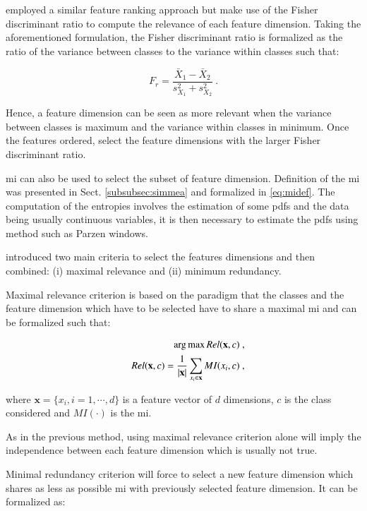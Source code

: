 \cite{Vos2012} employed a similar feature ranking approach but make use of the Fisher discriminant ratio to compute the relevance of each feature dimension. Taking the aforementioned formulation, the Fisher discriminant ratio is formalized as the ratio of the variance between classes to the variance within classes such that:

\begin{equation}
F_r = \frac{\bar{X}_1 - \bar{X}_2}{s^{2}_{X_1}+s^{2}_{X_2}} \ .
\label{eq:fisherratio}
\end{equation}

Hence, a feature dimension can be seen as more relevant when the variance between classes is maximum and the variance within classes in minimum. Once the features ordered, \cite{Vos2012} select the feature dimensions with the larger Fisher discriminant ratio.

\ac{mi} can also be used to select the subset of feature dimension. Definition of the \ac{mi} was presented in Sect. \ref{subsubsec:simmea} and formalized in \eqref{eq:midef}. The computation of the entropies involves the estimation of some \acp{pdf} and the data being usually continuous variables, it is then necessary to estimate the \acp{pdf} using method such as Parzen windows.

\cite{Peng2005} introduced two main criteria to select the features dimensions and then combined: (i) maximal relevance and (ii) minimum redundancy.

Maximal relevance criterion is based on the paradigm that the classes and the feature dimension which have to be selected have to share a maximal \ac{mi} and can be formalized such that:

\begin{eqnarray}
	&&\operatorname*{arg\,max} Rel(\mathbf{x},c) \ , \nonumber \\
	&& Rel(\mathbf{x},c) = \frac{1}{|\mathbf{x}|} \sum_{x_i \in \mathbf{x}} MI(x_i,c)  \ , \label{eq:mRel}
\end{eqnarray}

\noindent where $\mathbf{x} = \{x_i,i=1,\cdots,d\}$ is a feature vector of $d$ dimensions, $c$ is the class considered and $MI(\cdot)$ is the \ac{mi}.

As in the previous method, using maximal relevance criterion alone will imply the independence between each feature dimension which is usually not true.

Minimal redundancy criterion will force to select a new feature dimension which shares as less as possible \ac{mi} with previously selected feature dimension. It can be formalized as:

